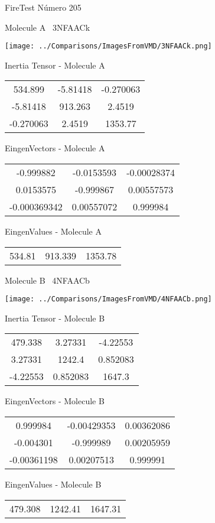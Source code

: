 \vtab[-3cm]
\begin{center}
{\large FireTest \tab Número 205}
\end{center}
\begin{multicols}{2}
\begin{center}

Molecule A \
3NFAACk

\texttt{[image: ../Comparisons/ImagesFromVMD/3NFAACk.png]}

Inertia Tensor - Molecule A \\
\begin{tabular}{|c c c|}
534.899	 & 	-5.81418	 & 	-0.270063	 \\
-5.81418	 & 	913.263	 & 	2.4519	 \\
-0.270063	 & 	2.4519	 & 	1353.77
\end{tabular}

\vtab
 EingenVectors - Molecule A     \\
\begin{tabular}{|c c c|}
-0.999882	 & 	-0.0153593	 & 	-0.00028374	 \\
0.0153575	 & 	-0.999867	 & 	0.00557573	 \\
-0.000369342	 & 	0.00557072	 & 	0.999984
\end{tabular}

\vtab
 EingenValues - Molecule A     \\
\begin{tabular}{|c c c|}
534.81	 & 	913.339	 & 	1353.78	 \\
\end{tabular}
\columnbreak

Molecule B \
4NFAACb

\texttt{[image: ../Comparisons/ImagesFromVMD/4NFAACb.png]}

Inertia Tensor - Molecule B \\
\begin{tabular}{|c c c|}
479.338	 & 	3.27331	 & 	-4.22553	 \\
3.27331	 & 	1242.4	 & 	0.852083	 \\
-4.22553	 & 	0.852083	 & 	1647.3
\end{tabular}

\vtab
 EingenVectors - Molecule B     \\
\begin{tabular}{|c c c|}
0.999984	 & 	-0.00429353	 & 	0.00362086	 \\
-0.004301	 & 	-0.999989	 & 	0.00205959	 \\
-0.00361198	 & 	0.00207513	 & 	0.999991
\end{tabular}

\vtab
 EingenValues - Molecule B     \\
\begin{tabular}{|c c c|}
479.308	 & 	1242.41	 & 	1647.31	 \\
\end{tabular}

\end{center}
\end{multicols}

